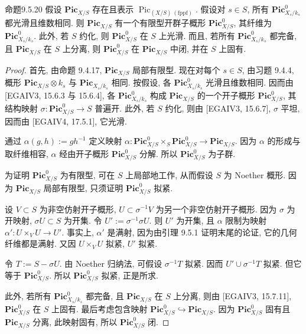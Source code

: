\begin{origstatement}{命题}{9.5.20}\label{ch09s05:prop9.5.20}
假设 $\mathbf{Pic}_{X/S}$ 存在且表示 $\operatorname{Pic}_{(X/S)\,\mathrm{(fppf)}}$. 假设对 $s\in S$, 所有 $\mathbf{Pic}^0_{X_s/k_s}$ 都光滑且维数相同. 则 $\mathbf{Pic}_{X/S}$ 有一个有限型开群子概形 $\mathbf{Pic}^0_{X/S}$, 其纤维为 $\mathbf{Pic}^0_{X_s/k_s}$. 此外, 若 $S$ 约化, 则 $\mathbf{Pic}^0_{X/S}$ 在 $S$ 上光滑. 而且, 若所有 $\mathbf{Pic}^0_{X_s/k_s}$ 都完备, 且 $\mathbf{Pic}_{X/S}$ 在 $S$ 上分离, 则 $\mathbf{Pic}^0_{X/S}$ 在 $\mathbf{Pic}_{X/S}$ 中闭, 并在 $S$ 上固有.
\end{origstatement}
\begin{proof}
首先, 由命题 9.4.17, $\mathbf{Pic}_{X/S}$ 局部有限型. 现在对每个 $s\in S$, 由习题 9.4.4, 概形 $\mathbf{Pic}_{X/S}\otimes k_s$ 与 $\mathbf{Pic}_{X_s/k_s}$ 相同. 按假设, 各 $\mathbf{Pic}^0_{X_s/k_s}$ 光滑且维数相同. 因而由 [EGAIV3, 15.6.3 与 15.6.4], 各 $\mathbf{Pic}^0_{X_s/k_s}$ 构成 $\mathbf{Pic}_{X/S}$ 的一个开子概形 $\mathbf{Pic}^0_{X/S}$, 其结构映射 $\sigma:\mathbf{Pic}^0_{X/S}\to S$ 普遍开. 此外, 若 $S$ 约化, 则由 [EGAIV3, 15.6.7], $\sigma$ 平坦, 因而由 [EGAIV4, 17.5.1], 它光滑.

通过 $\alpha(g,h):=gh^{-1}$ 定义映射 $\alpha:\mathbf{Pic}^0_{X/S}\times_S\mathbf{Pic}^0_{X/S}\to\mathbf{Pic}_{X/S}$. 因为 $\alpha$ 的形成与取纤维相容, $\alpha$ 经由开子概形 $\mathbf{Pic}^0_{X/S}$ 分解. 所以 $\mathbf{Pic}^0_{X/S}$ 为子群.

为证明 $\mathbf{Pic}^0_{X/S}$ 为有限型, 可在 $S$ 上局部地工作, 从而假设 $S$ 为 Noether 概形. 因为 $\mathbf{Pic}_{X/S}$ 局部有限型, 只须证明 $\mathbf{Pic}^0_{X/S}$ 拟紧.

设 $V\subset S$ 为非空仿射开子概形, $U\subset\sigma^{-1}V$ 为另一个非空仿射开子概形. 因为 $\sigma$ 为开映射, $\sigma U\subset S$ 为开集. 令 $U':=\sigma^{-1}\sigma U$. 则 $U'$ 为开集, 且 $\alpha$ 限制为映射 $\alpha':U\times_V U\to U'$. 事实上, $\alpha'$ 是满射, 因为由引理 9.5.1 证明末尾的论证, 它的几何纤维都是满射. 又因 $U\times_V U$ 拟紧, $U'$ 拟紧.

令 $T:=S-\sigma U$. 由 Noether 归纳法, 可假设 $\sigma^{-1}T$ 拟紧. 因而 $U'\cup\sigma^{-1}T$ 拟紧. 但它等于 $\mathbf{Pic}^0_{X/S}$. 所以 $\mathbf{Pic}^0_{X/S}$ 拟紧, 正是所求.

此外, 若所有 $\mathbf{Pic}^0_{X_s/k_s}$ 都完备, 且 $\mathbf{Pic}_{X/S}$ 在 $S$ 上分离, 则由 [EGAIV3, 15.7.11], $\mathbf{Pic}^0_{X/S}$ 在 $S$ 上固有. 最后考虑包含映射 $\mathbf{Pic}^0_{X/S}\hookrightarrow\mathbf{Pic}_{X/S}$. 因为 $\mathbf{Pic}^0_{X/S}$ 固有且 $\mathbf{Pic}_{X/S}$ 分离, 此映射固有, 所以 $\mathbf{Pic}^0_{X/S}$ 闭.
\end{proof}

